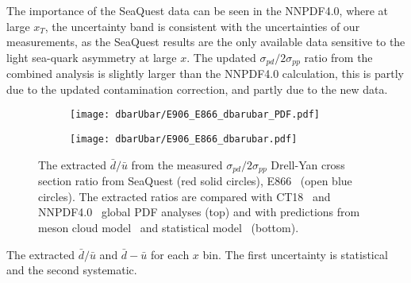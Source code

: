 \documentclass[../main.tex]{subfiles}
\begin{document}
The importance of the SeaQuest data can be seen in the NNPDF4.0, where at large $x_T$, the
uncertainty band is consistent with the uncertainties of our measurements, as the SeaQuest
results are the only available data sensitive to the light sea-quark asymmetry at large $x$.
The updated $\sigma_{pd}/2\sigma_{pp}$ ratio from the combined analysis is slightly larger than the NNPDF4.0
calculation, this is partly due to the updated contamination correction, and partly due to the new data.
\begin{figure}[htpb!]
	\centering
	\begin{subfigure}{0.55\linewidth}
		\texttt{[image: dbarUbar/E906\_E866\_dbarubar\_PDF.pdf]}
	\end{subfigure}
	\begin{subfigure}{0.55\linewidth}
		\texttt{[image: dbarUbar/E906\_E866\_dbarubar.pdf]}
	\end{subfigure}
	\caption{The extracted $\bar{d}/\bar{u}$ from the measured $\sigma_{pd}/2\sigma_{pp}$ Drell-Yan cross section ratio
		from SeaQuest (red solid circles), E866~\cite{towell2001} (open blue circles).
		The extracted ratios are compared with CT18~\cite{hou2021} and NNPDF4.0~\cite{ball2022a} global PDF analyses (top)
		and with predictions from meson cloud model~\cite{alberg2022} and statistical model~\cite{soffer2019} (bottom).}
	\label{fig:e906_e866_dbarubar}
\end{figure}
\begin{table}[htpb!]
	\centering
	\caption{The extracted $\bar{d}/\bar{u}$ and $\bar{d}-\bar{u}$ for each $x$ bin.
		The first uncertainty is statistical and the second systematic.}
	\label{tab:dbarubar_e906}
	
\end{table}
\end{document}
